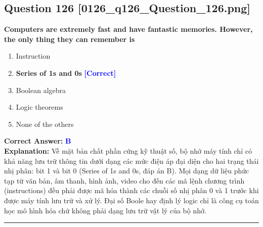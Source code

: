\documentclass[11pt,a4paper]{article}
\begin{document}
\begin{minipage}{\textwidth}
\subsection*{Question 126 \quad \footnotesize{[0126\_q126\_Question\_126.png]}}
\noindent \textbf{Computers are extremely fast and have fantastic memories. However, the only thing they can remember is}

\begin{enumerate}[label=\Alph*.]
    \item Instruction
    \item \textbf{Series of 1s and 0s} \hfill \textcolor{blue}{\textbf{[Correct]}}
    \item Boolean algebra
    \item Logic theorems
    \item None of the others
\end{enumerate}

\noindent \textbf{Correct Answer:} \textcolor{blue}{\textbf{B}} \\[2pt]
\noindent \textbf{Explanation:} Về mặt bản chất phần cứng kỹ thuật số, bộ nhớ máy tính chỉ có khả năng lưu trữ thông tin dưới dạng các mức điện áp đại diện cho hai trạng thái nhị phân: bit 1 và bit 0 (Series of 1s and 0s, đáp án B). Mọi dạng dữ liệu phức tạp từ văn bản, âm thanh, hình ảnh, video cho đến các mã lệnh chương trình (instructions) đều phải được mã hóa thành các chuỗi số nhị phân 0 và 1 trước khi được máy tính lưu trữ và xử lý. Đại số Boole hay định lý logic chỉ là công cụ toán học mô hình hóa chứ không phải dạng lưu trữ vật lý của bộ nhớ.

\par\vspace{0.3cm}
\hrule
\vspace{0.3cm}
\end{minipage}
\end{document}
